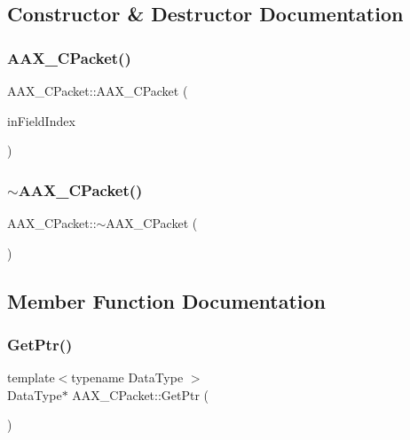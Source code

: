 \subsection{Constructor \& Destructor Documentation}
\mbox{\label{a01513_aff3be2253e450887b07a519c84fe47e2}} 
\subsubsection{\texorpdfstring{AAX\_CPacket()}{AAX\_CPacket()}}
{\footnotesize\ttfamily A\+A\+X\+\_\+\+C\+Packet\+::\+A\+A\+X\+\_\+\+C\+Packet (\begin{DoxyParamCaption}\item[{\mbox{\hyperlink{a00392_ae807f8986143820cfb5d6da32165c9c7}{A\+A\+X\+\_\+\+C\+Field\+Index}}}]{in\+Field\+Index }\end{DoxyParamCaption})\hspace{0.3cm}{\ttfamily [inline]}}

\mbox{\label{a01513_ac0dc6c7d54d3e2d8b2717dcc55be839e}} 
\subsubsection{\texorpdfstring{$\sim$AAX\_CPacket()}{~AAX\_CPacket()}}
{\footnotesize\ttfamily A\+A\+X\+\_\+\+C\+Packet\+::$\sim$\+A\+A\+X\+\_\+\+C\+Packet (\begin{DoxyParamCaption}{ }\end{DoxyParamCaption})\hspace{0.3cm}{\ttfamily [inline]}}



\subsection{Member Function Documentation}
\mbox{\label{a01513_a4f9bbeedcad126dd34e797ac4c8fc736}} 
\subsubsection{\texorpdfstring{GetPtr()}{GetPtr()}\hspace{0.1cm}{\footnotesize\ttfamily [1/2]}}
{\footnotesize\ttfamily template$<$typename Data\+Type $>$ \\
Data\+Type$\ast$ A\+A\+X\+\_\+\+C\+Packet\+::\+Get\+Ptr (\begin{DoxyParamCaption}{ }\end{DoxyParamCaption})\hspace{0.3cm}{\ttfamily [inline]}}

